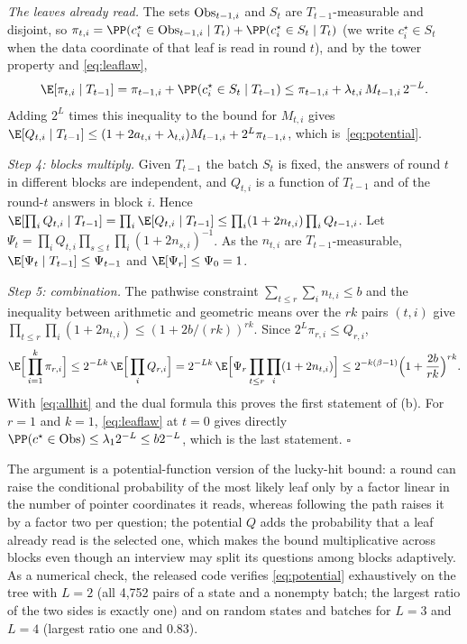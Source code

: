\emph{The leaves already read.} The sets ${\rm Obs}_{t-1,i}$ and $S_t$ are
$T_{t-1}$-measurable and disjoint, so
$\pi_{t,i}=\PP(c_i^\star\in{\rm Obs}_{t-1,i}\mid T_t)+\PP(c_i^\star\in S_t\mid T_t)$
(we write $c_i^\star\in S_t$ when the data coordinate of that leaf is read in round $t$),
and by the tower property and \eqref{eq:leaflaw},
\[
 \E[\pi_{t,i}\mid T_{t-1}]
 =\pi_{t-1,i}+\PP(c_i^\star\in S_t\mid T_{t-1})
 \le\pi_{t-1,i}+\lambda_{t,i}\,M_{t-1,i}\,2^{-L}.
\]
Adding $2^L$ times this inequality to the bound for $M_{t,i}$ gives
$\E[Q_{t,i}\mid T_{t-1}]\le(1+2a_{t,i}+\lambda_{t,i})M_{t-1,i}+2^L\pi_{t-1,i}$,
which is~\eqref{eq:potential}.

\emph{Step 4: blocks multiply.}
Given $T_{t-1}$ the batch $S_t$ is fixed, the answers of round $t$ in
different blocks are independent, and $Q_{t,i}$ is a function of $T_{t-1}$
and of the round-$t$ answers in block $i$. Hence
$\E[\prod_iQ_{t,i}\mid T_{t-1}]=\prod_i\E[Q_{t,i}\mid T_{t-1}]\le\prod_i(1+2n_{t,i})\prod_iQ_{t-1,i}$.
Let $\Psi_t=\prod_iQ_{t,i}\prod_{s\le t}\prod_i(1+2n_{s,i})^{-1}$. As the
$n_{t,i}$ are $T_{t-1}$-measurable, $\E[\Psi_t\mid T_{t-1}]\le\Psi_{t-1}$ and
$\E[\Psi_r]\le\Psi_0=1$.

\emph{Step 5: combination.}
The pathwise constraint $\sum_{t\le r}\sum_in_{t,i}\le b$ and the inequality
between arithmetic and geometric means over the $rk$ pairs $(t,i)$ give
$\prod_{t\le r}\prod_i(1+2n_{t,i})\le(1+2b/(rk))^{rk}$. Since
$2^L\pi_{r,i}\le Q_{r,i}$,
\[
 \E\Big[\prod_{i=1}^k\pi_{r,i}\Big]\le2^{-Lk}\,\E\Big[\prod_iQ_{r,i}\Big]
 =2^{-Lk}\,\E\Big[\Psi_r\prod_{t\le r}\prod_i(1+2n_{t,i})\Big]
 \le2^{-k(\beta-1)}\Big(1+\frac{2b}{rk}\Big)^{rk}.
\]
With \eqref{eq:allhit} and the dual formula this proves the first statement
of (b). For $r=1$ and $k=1$, \eqref{eq:leaflaw} at $t=0$ gives directly
$\PP(c^\star\in{\rm Obs})\le\lambda_12^{-L}\le b2^{-L}$, which is the last
statement. \hfill$\square$

The argument is a potential-function version of the lucky-hit bound: a
round can raise the conditional probability of the most likely leaf only by
a factor linear in the number of pointer coordinates it reads, whereas
following the path raises it by a factor two per question; the potential
$Q$ adds the probability that a leaf already read is the selected one, which
makes the bound multiplicative across blocks even though an interview may
split its questions among blocks adaptively. As a numerical check, the
released code verifies \eqref{eq:potential} exhaustively on the tree with
$L=2$ (all 4,752 pairs of a state and a nonempty batch; the largest ratio of
the two sides is exactly one) and on random states and batches for $L=3$
and $L=4$ (largest ratio one and $0.83$).
